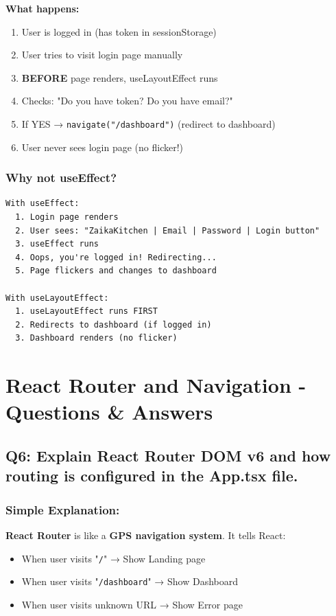 \documentclass[12pt]{article}
\begin{document}
\textbf{What happens:}

\begin{enumerate}
    \item User is logged in (has token in sessionStorage)
    \item User tries to visit login page manually
    \item \textbf{BEFORE} page renders, useLayoutEffect runs
    \item Checks: "Do you have token? Do you have email?"
    \item If YES → \texttt{navigate("/dashboard")} (redirect to dashboard)
    \item User never sees login page (no flicker!)
\end{enumerate}

\subsubsection*{Why not useEffect?}

\begin{lstlisting}
With useEffect:
  1. Login page renders
  2. User sees: "ZaikaKitchen | Email | Password | Login button"
  3. useEffect runs
  4. Oops, you're logged in! Redirecting...
  5. Page flickers and changes to dashboard
  
With useLayoutEffect:
  1. useLayoutEffect runs FIRST
  2. Redirects to dashboard (if logged in)
  3. Dashboard renders (no flicker)
\end{lstlisting}

\section{React Router and Navigation - Questions \& Answers}

\subsection{Q6: Explain React Router DOM v6 and how routing is configured in the App.tsx file.}

\subsubsection*{Simple Explanation:}

\textbf{React Router} is like a \textbf{GPS navigation system}. It tells React:
\begin{itemize}
    \item When user visits "\texttt{/}" → Show Landing page
    \item When user visits "\texttt{/dashboard}" → Show Dashboard
    \item When user visits unknown URL → Show Error page
\end{itemize}
\end{document}
